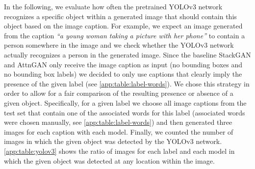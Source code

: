 \documentclass{article} \usepackage{iclr2019_conference,times}
\begin{document}
	In the following, we evaluate how often the pretrained YOLOv3 network recognizes a specific object within a generated image that should contain this object based on the image caption.
	For example, we expect an image generated from the caption \emph{``a young woman taking a picture with her phone''} to contain a person somewhere in the image and we check whether the YOLOv3 network actually recognizes a person in the generated image.
	Since the baseline StackGAN and AttnGAN only receive the image caption as input (no bounding boxes and no bounding box labels) we decided to only use captions that clearly imply the presence of the given label (see \autoref{app:table:label-words}).
	We chose this strategy in order to allow for a fair comparison of the resulting presence or absence of a given object.
	Specifically, for a given label we choose all image captions from the test set that contain one of the associated words for this label (associated words were chosen manually, see \autoref{app:table:label-words}) and then generated three images for each caption with each model.
	Finally, we counted the number of images in which the given object was detected by the YOLOv3 network.
	\autoref{app:table:yolov3} shows the ratio of images for each label and each model in which the given object was detected at any location within the image.
\end{document}
